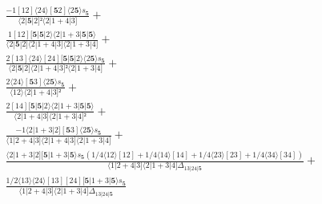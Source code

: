 \documentclass[varwidth, border=5pt]{standalone}
\begin{document}
\begin{my}
$\begin{gathered}
\scriptscriptstyle\frac{-1[12]⟨24⟩[𝟓2]⟨2𝟓⟩s_{𝟓}}{⟨2|𝟓|2]²⟨2|1+4|3]} +\\
\scriptscriptstyle\frac{1[12][𝟓|𝟓|2⟩⟨2|1+3|𝟓|𝟓⟩}{⟨2|𝟓|2]⟨2|1+4|3]⟨2|1+3|4]} +\\
\scriptscriptstyle\frac{2[13]⟨24⟩[24][𝟓|𝟓|2⟩⟨2𝟓⟩s_{𝟓}}{⟨2|𝟓|2]⟨2|1+4|3]²⟨2|1+3|4]} +\\
\scriptscriptstyle\frac{2⟨24⟩[𝟓3]⟨2𝟓⟩s_{𝟓}}{⟨12⟩⟨2|1+4|3]²} +\\
\scriptscriptstyle\frac{2[14][𝟓|𝟓|2⟩⟨2|1+3|𝟓|𝟓⟩}{⟨2|1+4|3]⟨2|1+3|4]²} +\\
\scriptscriptstyle\frac{-1⟨2|1+3|2][𝟓3]⟨2𝟓⟩s_{𝟓}}{⟨1|2+4|3]⟨2|1+4|3]⟨2|1+3|4]} +\\
\scriptscriptstyle\frac{⟨2|1+3|2][𝟓|1+3|𝟓⟩s_{𝟓}(1/4⟨12⟩[12]+1/4⟨14⟩[14]+1/4⟨23⟩[23]+1/4⟨34⟩[34])}{⟨1|2+4|3]⟨2|1+3|4]Δ_{13|24|𝟓}} +\\
\scriptscriptstyle\frac{1/2⟨13⟩⟨24⟩[13][24][𝟓|1+3|𝟓⟩s_{𝟓}}{⟨1|2+4|3]⟨2|1+3|4]Δ_{13|24|𝟓}} \phantom{+}
\end{gathered}$
\end{my}
\end{document}
